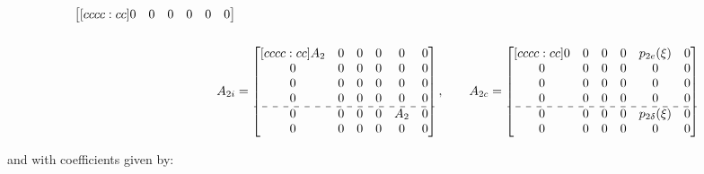 \documentclass[main.tex]{subfiles}
\begin{document}
\begin{align}
\begin{bmatrix}[cccc:cc]
		0 & 0 & 0 & 0 & 0 & 0		
		\end{bmatrix} \nonumber\\
		\nonumber\\
		A_{2i} &= 
		\begin{bmatrix}[cccc:cc]
		A_2 & 0 & 0 & 0 & 0 & 0\\
		0 & 0 & 0 & 0 & 0 & 0\\
		0 & 0 & 0 & 0 & 0 & 0\\
		0 & 0 & 0 & 0 & 0 & 0\\ \hdashline
		0 & 0 & 0 & 0 & A_2 & 0\\ 
		0 & 0 & 0 & 0 & 0 & 0
		\end{bmatrix}, \qquad
		A_{2c} = \begin{bmatrix}[cccc:cc]	
		0 & 0 & 0 & 0 & p_{2e}(\xi) & 0\\
		0 & 0 & 0 & 0 & 0 & 0\\
		0 & 0 & 0 & 0 & 0 & 0\\
		0 & 0 & 0 & 0 & 0 & 0\\ \hdashline
		0 & 0 & 0 & 0 & p_{2\delta}(\xi) & 0\\
		0 & 0 & 0 & 0 & 0 & 0		
		\end{bmatrix}	\nonumber	
	\end{align}
	
	and with coefficients given by:
	
\end{document}
